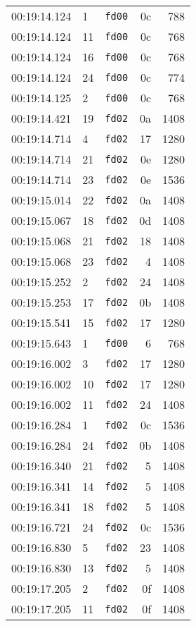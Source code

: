 \documentclass{article}
\begin{document}
\begin{longtable}{lllrr}
00:19:14.124 & 1 & \texttt{fd00} & 0c & 788 \\
00:19:14.124 & 11 & \texttt{fd00} & 0c & 768 \\
00:19:14.124 & 16 & \texttt{fd00} & 0c & 768 \\
00:19:14.124 & 24 & \texttt{fd00} & 0c & 774 \\
00:19:14.125 & 2 & \texttt{fd00} & 0c & 768 \\
00:19:14.421 & 19 & \texttt{fd02} & 0a & 1408 \\
00:19:14.714 & 4 & \texttt{fd02} & 17 & 1280 \\
00:19:14.714 & 21 & \texttt{fd02} & 0e & 1280 \\
00:19:14.714 & 23 & \texttt{fd02} & 0e & 1536 \\
00:19:15.014 & 22 & \texttt{fd02} & 0a & 1408 \\
00:19:15.067 & 18 & \texttt{fd02} & 0d & 1408 \\
00:19:15.068 & 21 & \texttt{fd02} & 18 & 1408 \\
00:19:15.068 & 23 & \texttt{fd02} & 4 & 1408 \\
00:19:15.252 & 2 & \texttt{fd02} & 24 & 1408 \\
00:19:15.253 & 17 & \texttt{fd02} & 0b & 1408 \\
00:19:15.541 & 15 & \texttt{fd02} & 17 & 1280 \\
00:19:15.643 & 1 & \texttt{fd00} & 6 & 768 \\
00:19:16.002 & 3 & \texttt{fd02} & 17 & 1280 \\
00:19:16.002 & 10 & \texttt{fd02} & 17 & 1280 \\
00:19:16.002 & 11 & \texttt{fd02} & 24 & 1408 \\
00:19:16.284 & 1 & \texttt{fd02} & 0c & 1536 \\
00:19:16.284 & 24 & \texttt{fd02} & 0b & 1408 \\
00:19:16.340 & 21 & \texttt{fd02} & 5 & 1408 \\
00:19:16.341 & 14 & \texttt{fd02} & 5 & 1408 \\
00:19:16.341 & 18 & \texttt{fd02} & 5 & 1408 \\
00:19:16.721 & 24 & \texttt{fd02} & 0c & 1536 \\
00:19:16.830 & 5 & \texttt{fd02} & 23 & 1408 \\
00:19:16.830 & 13 & \texttt{fd02} & 5 & 1408 \\
00:19:17.205 & 2 & \texttt{fd02} & 0f & 1408 \\
00:19:17.205 & 11 & \texttt{fd02} & 0f & 1408 \\

\end{longtable}
\end{document}
